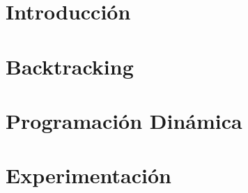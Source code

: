 \documentclass[hidelinks,a4paper, 11pt, nofootinbib]{article}
\begin{document}
\maketitle
\tableofcontents

\newpage

\section{Introducción}


\section{Backtracking}


\section{Programación Dinámica}



\section{Experimentación}

\end{document}
